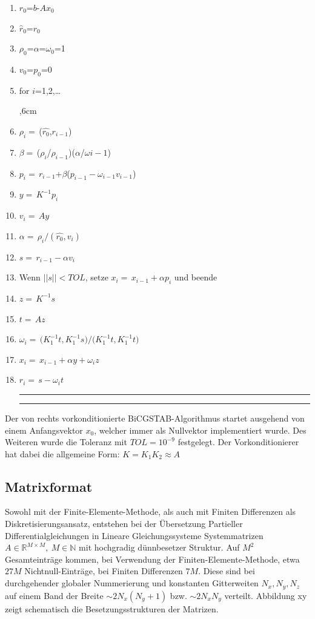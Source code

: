 \begin{enumerate}
	\setlength{\itemsep}{-6pt}
\hrule\hrule
	
	
	\item $r_0$=$b$-$A$$x_0$
	\item $\hat{r}_0$=$r_0$
	\item $\rho_0$=$\alpha$=$\omega_0$=1
	\item $v_0$=$p_0$=0
	\item for $i$=1,2,\dots
	\par
	\begingroup
	,6cm 
	\noindent 
	\item$\rho_i=$\,($\hat{r_0}$,$r_{i-1}$)
	\item$\beta=$\,($\rho_i$/$\rho_{i-1}$)($\alpha$/$\omega{i-1}$)
	\item$p_i=$\,$r_{i-1}$+$\beta$($p_{i-1}-\omega_{i-1}v_{i-1}$)	
	\item$y=$\,$K^{-1}p_i$
	\item$v_i=$\,$Ay$
	\item$\alpha=$\,$\rho_i/(\hat{r_0},v_i)$
	\item$s=$\,$r_{i-1}-\alpha$$v_i$
	\item Wenn $||s|| < TOL$, setze $x_i=$\,$x_{i-1}+\alpha$$p_i$ und beende 
	\item$z=$\,$K^{-1}s$
	\item$t=$\,$Az$
	\item$\omega_i=$\,$(K^{-1}_1$$t,K^{-1}_1$$s)/(K^{-1}_1$$t,K^{-1}_1$$t)$ 
	\item$x_i=$\,$x_{i-1}+\alpha$$y+\omega_i$$z$
	\item$r_i=$\,$s-\omega_i$$t$\\
	
	\hrule\hrule
	\par
	\endgroup 
	
\end{enumerate}



Der von rechts vorkonditionierte BiCGSTAB-Algorithmus startet ausgehend von einem Anfangsvektor $x_0$, welcher immer als Nullvektor implementiert wurde. Des Weiteren wurde die Toleranz mit $TOL= 10^{-9}$ festgelegt. Der Vorkonditionierer hat dabei die allgemeine Form: 
$K = K_1 K_2 \approx A $

\subsection{Matrixformat}

Sowohl mit der Finite-Elemente-Methode, als auch mit Finiten Differenzen als Diskretisierungsansatz, entstehen bei der Übersetzung Partieller Differentialgleichungen in Lineare Gleichungssysteme Systemmatrizen $A \in \mathbb{R}^{M \times M},~M \in \mathbb{N}$  mit hochgradig dünnbesetzer Struktur. Auf $M^2$ Gesamteinträge kommen, bei Verwendung der Finiten-Elemente-Methode, etwa $27M$ Nichtnull-Einträge, bei Finiten Differenzen $7M$. Diese sind bei durchgehender globaler Nummerierung und konstanten Gitterweiten $N_x,N_y,N_z$ auf einem Band der Breite $\sim 2 N_x (N_y+1)$ bzw. $\sim 2 N_xN_y$ verteilt. Abbildung xy zeigt schematisch die Besetzungsstrukturen der Matrizen.\\

